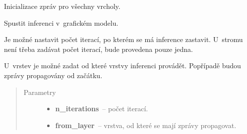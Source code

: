 \begin{fulllineitems}
\begin{fulllineitems}
\end{fulllineitems}


\begin{fulllineitems}
\label{alex.infer:alex.infer.factor.alex.infer.lbp.LBP.init_messages}
Inicializace zpráv pro všechny vrcholy.

\end{fulllineitems}


\begin{fulllineitems}
\label{alex.infer:alex.infer.factor.alex.infer.lbp.LBP.run}\pysiglinewithargsret{\bfcode{run}}{\emph{n\_iterations=1, from\_layer{]}}}{}
Spustit inferenci v~grafickém modelu.

Je možné nastavit počet iterací, po kterém se má inference zastavit.
U~stromu není třeba zadávat počet iterací, bude provedena pouze jedna.

U~vrstev je možné zadat od které vrstvy inferenci provádět.
Popřípadě budou zprávy propagovány od začátku.
\begin{quote}\begin{description}
\item[{Parametry}] \leavevmode\begin{itemize}
\item {} 
\textbf{n\_iterations}~-- počet iterací.

\item {} 
\textbf{from\_layer}~-- vrstva, od které se mají zprávy propagovat.

\end{itemize}

\end{description}\end{quote}

\end{fulllineitems}


\end{fulllineitems}

